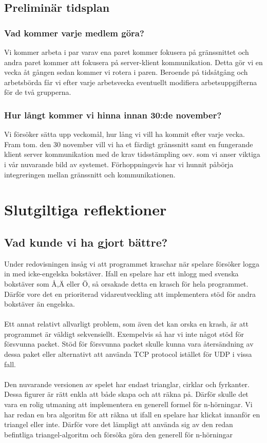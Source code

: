 \documentclass[a4paper]{article}
\begin{document}
\subsection{Preliminär tidsplan}
\subsubsection{Vad kommer varje medlem göra?}
Vi kommer arbeta i par varav ena paret kommer fokusera på gränssnittet och andra paret kommer att fokusera på server-klient kommunikation. Detta gör vi en vecka åt gången sedan kommer vi rotera i paren. Beroende på tidsåtgång och arbetsbörda får vi efter varje arbetsvecka eventuellt modifiera arbetsuppgifterna för de två grupperna.
\subsubsection{Hur långt kommer vi hinna innan 30:de november?}
Vi försöker sätta upp veckomål, hur lång vi vill ha kommit efter varje vecka. Fram tom. den 30 november vill vi ha et färdigt gränssnitt samt en fungerande klient server kommunikation med de krav tidsstämpling osv. som vi anser viktiga i vår nuvarande bild av systemet. Förhoppningsvis har vi hunnit påbörja integreringen mellan gränssnitt och kommunikationen.

\newpage

\section{Slutgiltiga reflektioner}

\subsection{Vad kunde vi ha gjort bättre?}
Under redovisningen insåg vi att programmet kraschar när spelare försöker logga in med icke-engelska bokstäver. Ifall en spelare har ett inlogg med svenska bokstäver som Å,Ä eller Ö, så orsakade detta en krasch för hela programmet. Därför vore det en prioriterad vidareutveckling att implementera stöd för andra bokstäver än engelska. \\
\\
Ett annat relativt allvarligt problem, som även det kan orska en krash, är att programmet är väldigt sekvensiellt. Exempelvis så har vi inte något stöd för försvunna packet. Stöd för försvunna packet skulle kunna vara återsändning av dessa paket eller alternativt att använda TCP protocol istället för UDP i vissa fall. \\
\\
Den nuvarande versionen av spelet har endast trianglar, cirklar och fyrkanter. Dessa figurer är rätt enkla att både skapa och att räkna på. Därför skulle det vara en rolig utmaning att implementera en generell formel för n-hörningar. Vi har redan en bra algoritm för att räkna ut ifall en spelare har klickat innanför en triangel eller inte. Därför vore det lämpligt att använda sig av den redan befintliga triangel-algoritm och försöka göra den generell för n-hörningar\\
\\
\end{document}

